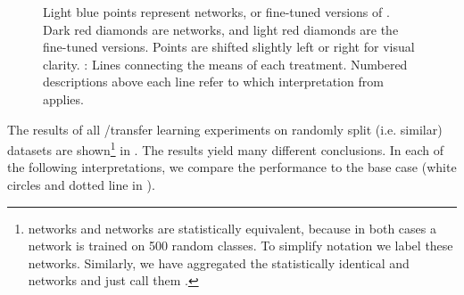 \begin{figure}[t]
{%
Light blue points represent  networks, or fine-tuned versions of . Dark red diamonds are  networks,
and light red diamonds are the fine-tuned  versions.
%
Points are shifted slightly left or right for visual clarity. : Lines connecting the means of each treatment. Numbered descriptions above each line refer to which interpretation from  applies.
}
\end{figure}





The results of all \dA/\dB transfer learning experiments on randomly split (i.e. similar) datasets are shown\footnote{ networks and  networks are
 statistically equivalent, because in both cases a network is trained on 500 random classes. To simplify notation we label these  networks. Similarly,
 we have aggregated the statistically identical  and  networks and just call them .}
 in .
The results yield many different conclusions. In each of the following interpretations, we compare the performance to the base case (white circles and dotted line in ).



